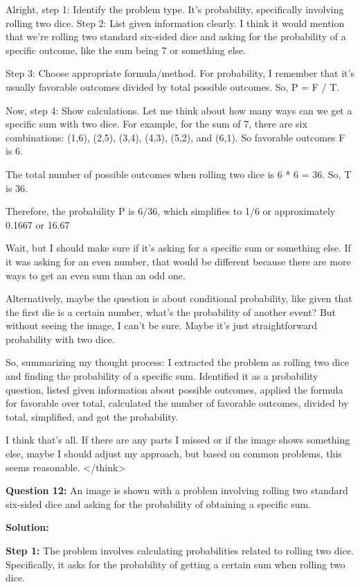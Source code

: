 \documentclass[12pt]{article}
\begin{document}
Alright, step 1: Identify the problem type. It's probability, specifically involving rolling two dice. Step 2: List given information clearly. I think it would mention that we're rolling two standard six-sided dice and asking for the probability of a specific outcome, like the sum being 7 or something else.

Step 3: Choose appropriate formula/method. For probability, I remember that it's usually favorable outcomes divided by total possible outcomes. So, P = F / T. 

Now, step 4: Show calculations. Let me think about how many ways can we get a specific sum with two dice. For example, for the sum of 7, there are six combinations: (1,6), (2,5), (3,4), (4,3), (5,2), and (6,1). So favorable outcomes F is 6.

The total number of possible outcomes when rolling two dice is 6 * 6 = 36. So, T is 36.

Therefore, the probability P is 6/36, which simplifies to 1/6 or approximately 0.1667 or 16.67%

Wait, but I should make sure if it's asking for a specific sum or something else. If it was asking for an even number, that would be different because there are more ways to get an even sum than an odd one.

Alternatively, maybe the question is about conditional probability, like given that the first die is a certain number, what's the probability of another event? But without seeing the image, I can't be sure. Maybe it's just straightforward probability with two dice.

So, summarizing my thought process: I extracted the problem as rolling two dice and finding the probability of a specific sum. Identified it as a probability question, listed given information about possible outcomes, applied the formula for favorable over total, calculated the number of favorable outcomes, divided by total, simplified, and got the probability.

I think that's all. If there are any parts I missed or if the image shows something else, maybe I should adjust my approach, but based on common problems, this seems reasonable.
</think>

\textbf{Question 12:}  
An image is shown with a problem involving rolling two standard six-sided dice and asking for the probability of obtaining a specific sum.

\textbf{Solution:}

\textbf{Step 1:}  
The problem involves calculating probabilities related to rolling two dice. Specifically, it asks for the probability of getting a certain sum when rolling two dice.
\end{document}
